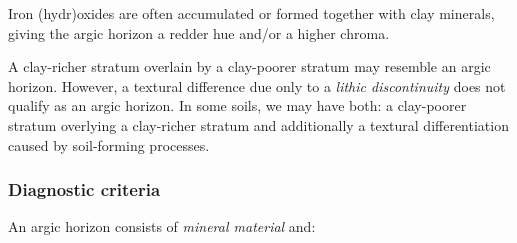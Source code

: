 \documentclass[
  letterpaper,
  DIV=11,
  numbers=noendperiod]{scrreprt}
\begin{document}
Iron (hydr)oxides are often accumulated or formed together with clay
minerals, giving the argic horizon a redder hue and/or a higher chroma.

A clay-richer stratum overlain by a clay-poorer stratum may resemble an
argic horizon. However, a textural difference due only to a \emph{lithic
discontinuity} does not qualify as an argic horizon. In some soils, we
may have both: a clay-poorer stratum overlying a clay-richer stratum and
additionally a textural differentiation caused by soil-forming
processes.

\hypertarget{diagnostic-criteria-2}{%
\subsubsection{Diagnostic criteria}\label{diagnostic-criteria-2}}

An argic horizon consists of \emph{mineral material} and:
\end{document}
